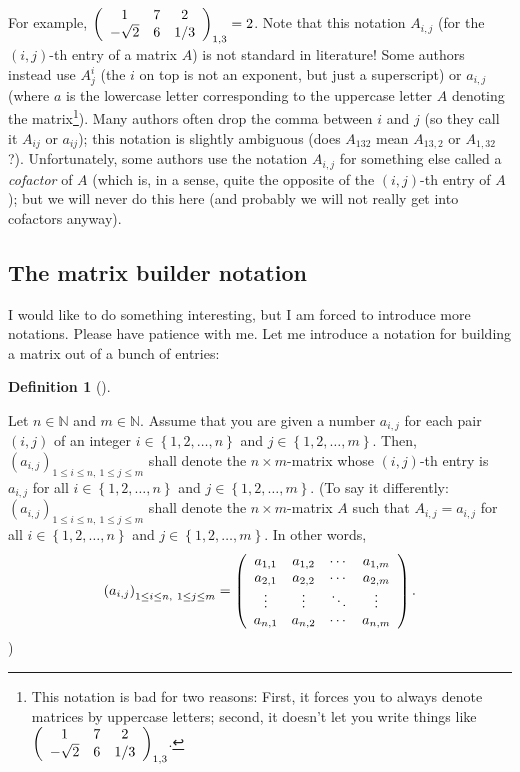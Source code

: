 \documentclass[numbers=enddot,12pt,final,onecolumn,notitlepage]{scrartcl}%
\theoremstyle{definition}
\newtheorem{defi}[theo]{Definition}
\newenvironment{definition}[1][]
{\begin{defi}[#1]\begin{leftbar}}
{\end{leftbar}\end{defi}}
\begin{document}
For example, $\left(
\begin{array}
[c]{ccc}%
1 & 7 & 2\\
-\sqrt{2} & 6 & 1/3
\end{array}
\right)  _{1,3}=2$. Note that this notation $A_{i,j}$ (for the $\left(
i,j\right)  $-th entry of a matrix $A$) is not standard in literature! Some
authors instead use $A_{j}^{i}$ (the $i$ on top is not an exponent, but just a
superscript) or $a_{i,j}$ (where $a$ is the lowercase letter corresponding to
the uppercase letter $A$ denoting the matrix\footnote{This notation is bad for
two reasons: First, it forces you to always denote matrices by uppercase
letters; second, it doesn't let you write things like $\left(
\begin{array}
[c]{ccc}%
1 & 7 & 2\\
-\sqrt{2} & 6 & 1/3
\end{array}
\right)  _{1,3}$.}). Many authors often drop the comma between $i$ and $j$ (so
they call it $A_{ij}$ or $a_{ij}$); this notation is slightly ambiguous (does
$A_{132}$ mean $A_{13,2}$ or $A_{1,32}$ ?). Unfortunately, some authors use
the notation $A_{i,j}$ for something else called a \textit{cofactor} of $A$
(which is, in a sense, quite the opposite of the $\left(  i,j\right)  $-th
entry of $A$); but we will never do this here (and probably we will not really
get into cofactors anyway).

\subsection{The matrix builder notation}

I would like to do something interesting, but I am forced to introduce more
notations. Please have patience with me. Let me introduce a notation for
building a matrix out of a bunch of entries:

\begin{definition}
Let $n\in\mathbb{N}$ and $m\in\mathbb{N}$. Assume that you are given a number
$a_{i,j}$ for each pair $\left(  i,j\right)  $ of an integer $i\in\left\{
1,2,\ldots,n\right\}  $ and $j\in\left\{  1,2,\ldots,m\right\}  $. Then,
$\left(  a_{i,j}\right)  _{1\leq i\leq n,\ 1\leq j\leq m}$ shall denote the
$n\times m$-matrix whose $\left(  i,j\right)  $-th entry is $a_{i,j}$ for all
$i\in\left\{  1,2,\ldots,n\right\}  $ and $j\in\left\{  1,2,\ldots,m\right\}
$. (To say it differently: $\left(  a_{i,j}\right)  _{1\leq i\leq n,\ 1\leq
j\leq m}$ shall denote the $n\times m$-matrix $A$ such that $A_{i,j}=a_{i,j}$
for all $i\in\left\{  1,2,\ldots,n\right\}  $ and $j\in\left\{  1,2,\ldots
,m\right\}  $. In other words,%
\[
\left(  a_{i,j}\right)  _{1\leq i\leq n,\ 1\leq j\leq m}=\left(
\begin{array}
[c]{cccc}%
a_{1,1} & a_{1,2} & \cdots & a_{1,m}\\
a_{2,1} & a_{2,2} & \cdots & a_{2,m}\\
\vdots & \vdots & \ddots & \vdots\\
a_{n,1} & a_{n,2} & \cdots & a_{n,m}%
\end{array}
\right)  .
\]
)
\end{definition}
\end{document}
